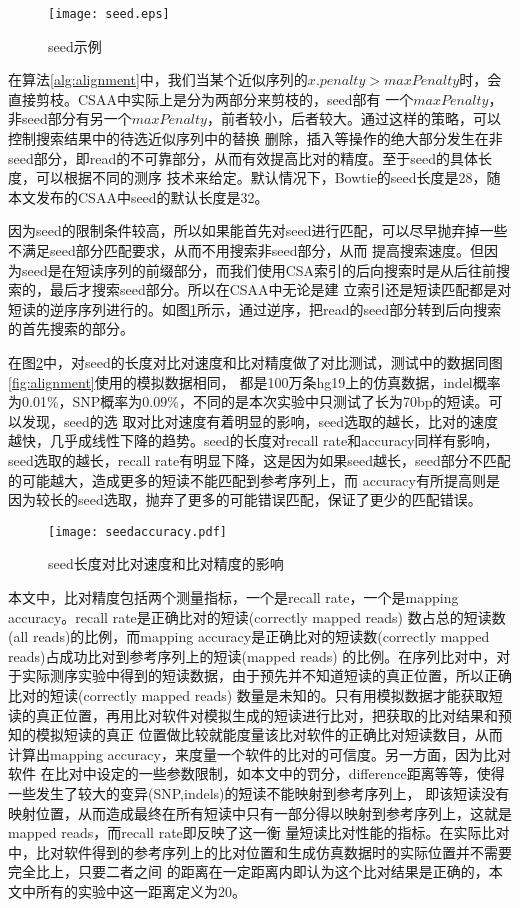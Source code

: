 \begin{figure}[htbp]
    \centering
    \texttt{[image: seed.eps]}
    \caption{seed示例} \label{fig:seed}
\end{figure}

在算法\ref{alg:alignment}中，我们当某个近似序列的$x.penalty>maxPenalty$时，会直接剪枝。CSAA中实际上是分为两部分来剪枝的，seed部有
一个$maxPenalty$，非seed部分有另一个$maxPenalty$，前者较小，后者较大。通过这样的策略，可以控制搜索结果中的待选近似序列中的替换
删除，插入等操作的绝大部分发生在非seed部分，即read的不可靠部分，从而有效提高比对的精度。至于seed的具体长度，可以根据不同的测序
技术来给定。默认情况下，Bowtie的seed长度是28，随本文发布的CSAA中seed的默认长度是32。

因为seed的限制条件较高，所以如果能首先对seed进行匹配，可以尽早抛弃掉一些不满足seed部分匹配要求，从而不用搜索非seed部分，从而
提高搜索速度。但因为seed是在短读序列的前缀部分，而我们使用CSA索引的后向搜索时是从后往前搜索的，最后才搜索seed部分。所以在CSAA中无论是建
立索引还是短读匹配都是对短读的逆序序列进行的。如图\ref{fig:seed}所示，通过逆序，把read的seed部分转到后向搜索的首先搜索的部分。

在图\ref{fig:seedaccuracy}中，对seed的长度对比对速度和比对精度做了对比测试，测试中的数据同图\ref{fig:alignment}使用的模拟数据相同，
都是100万条hg19上的仿真数据，indel概率为0.01\%，SNP概率为0.09\%，不同的是本次实验中只测试了长为70bp的短读。可以发现，seed的选
取对比对速度有着明显的影响，seed选取的越长，比对的速度越快，几乎成线性下降的趋势。seed的长度对recall rate和accuracy同样有影响，
seed选取的越长，recall rate有明显下降，这是因为如果seed越长，seed部分不匹配的可能越大，造成更多的短读不能匹配到参考序列上，而
accuracy有所提高则是因为较长的seed选取，抛弃了更多的可能错误匹配，保证了更少的匹配错误。

\begin{figure}[htbp]
    \centering
    \texttt{[image: seedaccuracy.pdf]}
    \caption{seed长度对比对速度和比对精度的影响} \label{fig:seedaccuracy}
\end{figure}



本文中，比对精度包括两个测量指标，一个是recall rate，一个是mapping accuracy。recall rate是正确比对的短读(correctly mapped reads)
数占总的短读数(all reads)的比例，而mapping accuracy是正确比对的短读数(correctly mapped reads)占成功比对到参考序列上的短读(mapped reads)
的比例。在序列比对中，对于实际测序实验中得到的短读数据，由于预先并不知道短读的真正位置，所以正确比对的短读(correctly mapped reads)
数量是未知的。只有用模拟数据才能获取短读的真正位置，再用比对软件对模拟生成的短读进行比对，把获取的比对结果和预知的模拟短读的真正
位置做比较就能度量该比对软件的正确比对短读数目，从而计算出mapping accuracy，来度量一个软件的比对的可信度。另一方面，因为比对软件
在比对中设定的一些参数限制，如本文中的罚分，difference距离等等，使得一些发生了较大的变异(SNP,indels)的短读不能映射到参考序列上，
即该短读没有映射位置，从而造成最终在所有短读中只有一部分得以映射到参考序列上，这就是mapped reads，而recall rate即反映了这一衡
量短读比对性能的指标。在实际比对中，比对软件得到的参考序列上的比对位置和生成仿真数据时的实际位置并不需要完全比上，只要二者之间
的距离在一定距离内即认为这个比对结果是正确的，本文中所有的实验中这一距离定义为20。


